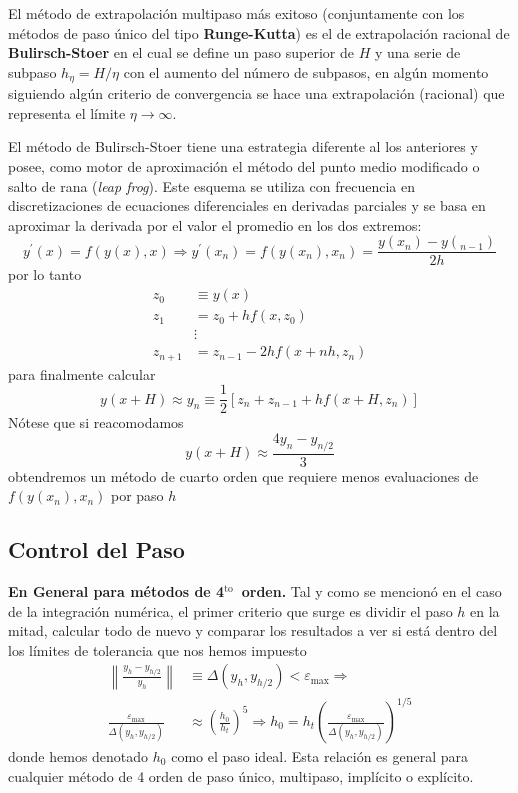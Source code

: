 \documentclass[spanish,titlepage,11pt]{article}
\begin{document}
El m\'{e}todo de extrapolaci\'{o}n multipaso m\'{a}s exitoso (conjuntamente
con los m\'{e}todos de paso \'{u}nico del tipo \textbf{Runge-Kutta}) es el de
extrapolaci\'{o}n racional de \textbf{Bulirsch-Stoer} en el cual se define un
paso superior de $H$ y una serie de subpaso $h_{\eta}=H/\eta$ con el aumento
del n\'{u}mero de subpasos, en alg\'{u}n momento siguiendo alg\'{u}n criterio
de convergencia se hace una extrapolaci\'{o}n (racional) que representa el
l\'{i}mite $\eta\rightarrow\infty.$

El m\'{e}todo de Bulirsch-Stoer tiene una estrategia diferente al los
anteriores y posee, como motor de aproximaci\'{o}n el m\'{e}todo del punto
medio modificado o salto de rana (\textit{leap frog}). Este esquema se utiliza
con frecuencia en discretizaciones de ecuaciones diferenciales en derivadas
parciales y se basa en aproximar la derivada por el valor el promedio en los
dos extremos:
\[
y^{\prime}(x)=f(y(x),x)\Rightarrow y^{\prime}(x_{n})=f(y(x_{n}),x_{n}%
)=\frac{y(x_{n})-y(_{n-1})}{2h}
\]
por lo tanto
\begin{align*}
z_{0}  &  \equiv y(x)\\
z_{1}  &  =z_{0}+hf(x,z_{0})\\
&  \vdots\\
z_{n+1}  &  =z_{n-1}-2hf(x+nh,z_{n})
\end{align*}
para finalmente calcular
\[
y(x+H)\approx y_{n}\equiv\frac{1}{2}\left[  z_{n}+z_{n-1}+hf\left(
x+H,z_{n}\right)  \right]
\]
N\'{o}tese que si reacomodamos
\[
y(x+H)\approx\frac{4y_{n}-y_{n/2}}{3}
\]
obtendremos un m\'{e}todo de cuarto orden que requiere menos evaluaciones de
$f(y(x_{n}),x_{n})$ por paso $h$

\subsection{Control del Paso}

\textbf{En General para m\'{e}todos de 4}$^{\text{to}}$\textbf{\ orden. }Tal y
como se mencion\'{o} en el caso de la integraci\'{o}n num\'{e}rica, el primer
criterio que surge es dividir el paso $h$ en la mitad, calcular todo de nuevo
y comparar los resultados a ver si est\'{a} dentro del los l\'{i}mites de
tolerancia que nos hemos impuesto
\begin{align*}
\left\|  \frac{y_{h}-y_{h/2}}{y_{h}}\right\|   &  \equiv\Delta\left(
y_{h},y_{h/2}\right)  <\varepsilon_{\max}\Rightarrow\\
\frac{\varepsilon_{\max}}{\Delta\left(  y_{h},y_{h/2}\right)  } &
\approx\left(  \frac{h_{0}}{h_{t}}\right)  ^{5}\Rightarrow h_{0}=h_{t}\left(
\frac{\varepsilon_{\max}}{\Delta\left(  y_{h},y_{h/2}\right)  }\right)  ^{1/5}%
\end{align*}
donde hemos denotado $h_{0}$ como el paso ideal. Esta relaci\'{o}n es general
para cualquier m\'{e}todo de 4 orden de paso \'{u}nico, multipaso,
impl\'{i}cito o expl\'{i}cito.
\end{document}
